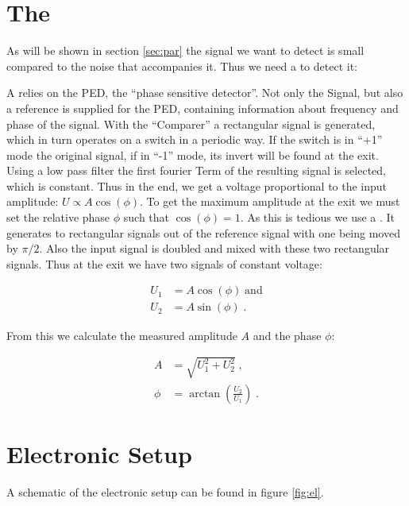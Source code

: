 \documentclass[twoside, a4paper, DIV=11,twocolumn, 12pt]{book}
\begin{document}

\section{The \LIA}
\label{sec:lia}

As will be shown in section \ref{sec:par} the signal we want to detect is small compared to the noise that accompanies it. Thus we need a \LIA to detect it:

A \LIA relies on the PED, the ``phase sensitive detector''. Not only the Signal, but also a reference is supplied for the PED, containing information about frequency and phase of the signal. With the ``Comparer'' a rectangular signal is generated, which in turn operates on a switch in a periodic way. If the switch is in ``+1'' mode the original signal, if in ``-1'' mode, its invert  will be found at the exit. Using a low pass filter the first fourier Term of the resulting signal is selected, which is constant. Thus in the end, we get a voltage proportional to the input amplitude: $U \propto A\operatorname{cos}(\phi)$.
To get the maximum amplitude at the exit we must set the relative phase $\phi$ such that $\operatorname{cos}(\phi) = 1$. As this is tedious we use a \DLIA. It generates to rectangular signals out of the reference signal with one being moved by $\pi/2$. Also the input signal is doubled and mixed with these two rectangular signals. Thus at the exit we have two signals of constant voltage:

\begin{align}
 U_1 &= A\operatorname{cos}(\phi) \; \text{and} \\
 U_2 &= A\operatorname{sin}(\phi) \; \text{.}
\end{align}

From this we calculate the measured amplitude $A$ and the phase $\phi$:

\begin{align}
 A &= \sqrt{U_1^2 + U_2^2} \; \text{,} \\
 \phi &= \operatorname{arctan}\left( \frac{U_2}{U_1} \right) \; \text{.}
\end{align}

\section{Electronic Setup}
\label{sec:el}

A schematic of the electronic setup can be found in figure \ref{fig:el}. 
\end{document}
